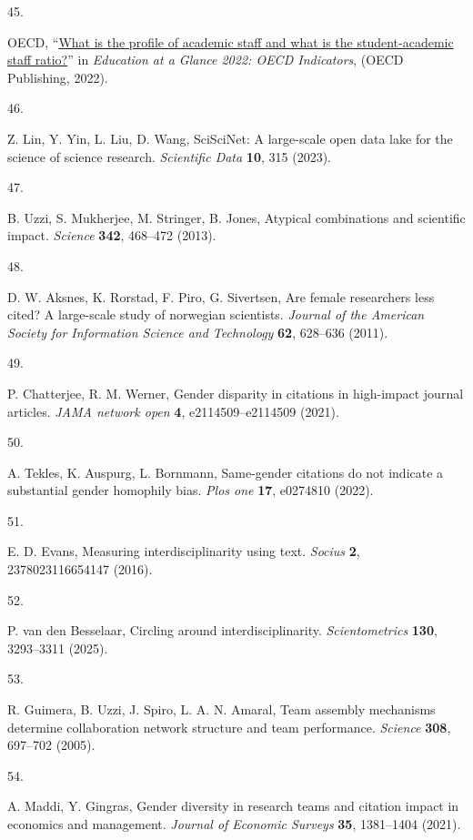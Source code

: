 \documentclass[
  british,
  12pt,
]{article}
\newlength{\cslhangindent}
\newlength{\csllabelwidth}
\newenvironment{CSLReferences}[2] %
 {\begin{list}{}{%
  \setlength{\itemindent}{0pt}
  \setlength{\leftmargin}{0pt}
  \setlength{\parsep}{0pt}
  \ifodd #1
   \setlength{\leftmargin}{\cslhangindent}
   \setlength{\itemindent}{-1\cslhangindent}
  \fi
  \setlength{\itemsep}{#2\baselineskip}}}
 {\end{list}}
\newcommand{\CSLLeftMargin}[1]{\parbox[t]{\csllabelwidth}{\strut#1\strut}}
\newcommand{\CSLRightInline}[1]{\parbox[t]{\linewidth - \csllabelwidth}{\strut#1\strut}}
\begin{document}
\begin{CSLReferences}{0}{1}
\CSLLeftMargin{45. }%
\CSLRightInline{OECD, {``\href{https://doi.org/10.1787/bb6ee273-en}{What is the profile of academic staff and what is the student-academic staff ratio?}''} in \emph{Education at a Glance 2022: OECD Indicators}, (OECD Publishing, 2022).}

\CSLLeftMargin{46. }%
\CSLRightInline{Z. Lin, Y. Yin, L. Liu, D. Wang, SciSciNet: A large-scale open data lake for the science of science research. \emph{Scientific Data} \textbf{10}, 315 (2023).}

\CSLLeftMargin{47. }%
\CSLRightInline{B. Uzzi, S. Mukherjee, M. Stringer, B. Jones, Atypical combinations and scientific impact. \emph{Science} \textbf{342}, 468--472 (2013).}

\CSLLeftMargin{48. }%
\CSLRightInline{D. W. Aksnes, K. Rorstad, F. Piro, G. Sivertsen, Are female researchers less cited? A large-scale study of norwegian scientists. \emph{Journal of the American Society for Information Science and Technology} \textbf{62}, 628--636 (2011).}

\CSLLeftMargin{49. }%
\CSLRightInline{P. Chatterjee, R. M. Werner, Gender disparity in citations in high-impact journal articles. \emph{JAMA network open} \textbf{4}, e2114509--e2114509 (2021).}

\CSLLeftMargin{50. }%
\CSLRightInline{A. Tekles, K. Auspurg, L. Bornmann, Same-gender citations do not indicate a substantial gender homophily bias. \emph{Plos one} \textbf{17}, e0274810 (2022).}

\CSLLeftMargin{51. }%
\CSLRightInline{E. D. Evans, Measuring interdisciplinarity using text. \emph{Socius} \textbf{2}, 2378023116654147 (2016).}

\CSLLeftMargin{52. }%
\CSLRightInline{P. van den Besselaar, Circling around interdisciplinarity. \emph{Scientometrics} \textbf{130}, 3293--3311 (2025).}

\CSLLeftMargin{53. }%
\CSLRightInline{R. Guimera, B. Uzzi, J. Spiro, L. A. N. Amaral, Team assembly mechanisms determine collaboration network structure and team performance. \emph{Science} \textbf{308}, 697--702 (2005).}

\CSLLeftMargin{54. }%
\CSLRightInline{A. Maddi, Y. Gingras, Gender diversity in research teams and citation impact in economics and management. \emph{Journal of Economic Surveys} \textbf{35}, 1381--1404 (2021).}


\end{CSLReferences}
\end{document}
